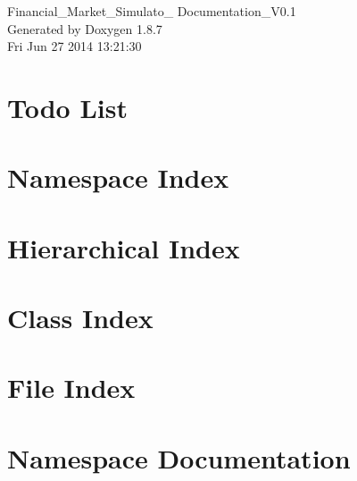 \documentclass[twoside]{book}
\newcommand{\+}{\discretionary{\mbox{\scriptsize$\hookleftarrow$}}{}{}}
\newcommand{\clearemptydoublepage}{%
  \newpage{\pagestyle{empty}\cleardoublepage}%
}
\begin{document}
\hypersetup{pageanchor=false,
             bookmarks=true,
             bookmarksnumbered=true,
             pdfencoding=unicode
            }
\begin{titlepage}
\vspace*{7cm}
\begin{center}%
{\Large Financial\+\_\+\+Market\+\_\+\+Simulato\+\_\+ Documentation\+\_\+\+V0.1 }\\
\vspace*{1cm}
{\large Generated by Doxygen 1.8.7}\\
\vspace*{0.5cm}
{\small Fri Jun 27 2014 13:21:30}\\
\end{center}
\end{titlepage}
\clearemptydoublepage
\tableofcontents
\clearemptydoublepage
{}
\hypersetup{pageanchor=true}

\chapter{Todo List}
\label{todo}
\hypertarget{todo}{}

\chapter{Namespace Index}

\chapter{Hierarchical Index}

\chapter{Class Index}

\chapter{File Index}

\chapter{Namespace Documentation}




\end{document}
